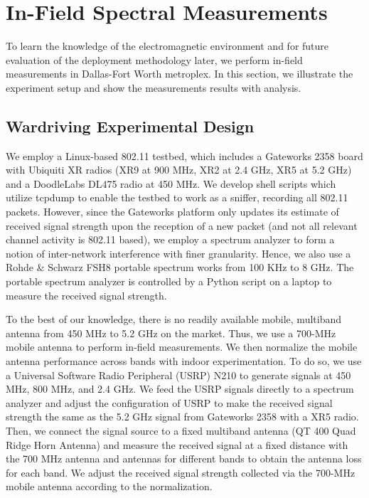 \section{In-Field Spectral Measurements}
\label{sec:measurements}

To learn the knowledge of the electromagnetic environment and for future evaluation of the deployment 
methodology later, we perform in-field measurements in Dallas-Fort Worth metroplex. In this section, 
we illustrate the experiment setup and show the measurements results with analysis.
 
\subsection{Wardriving Experimental Design}
\label{subsec:measurementdesign}
We employ a Linux-based 802.11 testbed, which includes a Gateworks 2358 board with Ubiquiti XR radios 
(XR9 at 900 MHz, XR2 at 2.4 GHz, XR5 at 5.2 GHz) and a DoodleLabs DL475 radio at 450 MHz. We develop 
shell scripts which utilize tcpdump to enable the testbed to work as a sniffer, recording all 802.11 
packets. However, since the Gateworks platform only updates its estimate of received signal strength 
upon the reception of a new packet (and not all relevant channel activity is 802.11 based), we employ 
a spectrum analyzer to form a notion of inter-network interference with finer granularity.  Hence, we 
also use a Rohde \& Schwarz FSH8 portable spectrum works from 100 KHz to 8 GHz. The portable spectrum 
analyzer is controlled by a Python script on a laptop to measure the received signal strength.

To the best of our knowledge, there is no readily available mobile, multiband antenna from 450 MHz to 5.2 
GHz on the market. Thus, we use a 700-MHz mobile antenna to perform in-field measurements. We then 
normalize the mobile antenna performance across bands with indoor experimentation. To do so, we use a 
Universal Software Radio Peripheral (USRP) N210 to generate signals at 450 MHz, 800 MHz, and 2.4 GHz. We 
feed the USRP signals directly to a spectrum analyzer and adjust the configuration of USRP to make the 
received signal strength the same as the 5.2 GHz signal from Gateworks 2358 with a XR5 radio. Then, we 
connect the signal source to a fixed multiband antenna (QT 400 Quad Ridge Horn Antenna) and measure the
received signal at a fixed distance with the 700 MHz antenna and antennas for different bands to obtain 
the antenna loss for each band. We adjust the received signal strength collected via the 700-MHz mobile 
antenna according to the normalization. 

